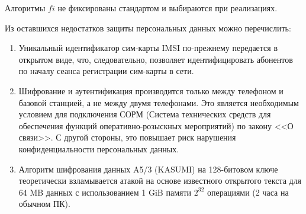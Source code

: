 Алгоритмы $fi$ не фиксированы стандартом и выбираются при реализациях.

Из оставшихся недостатков защиты персональных данных можно перечислить:
\begin{enumerate}
    \item Уникальный идентификатор сим-карты IMSI по-прежнему передается в открытом виде, что, следовательно, позволяет идентифицировать абонентов по началу сеанса регистрации сим-карты в сети.
    \item Шифрование и аутентификация производится только между телефоном и базовой станцией, а не между двумя телефонами. Это является необходимым условием для подключения СОРМ (Система технических средств для обеспечения функций оперативно-розыскных мероприятий) по закону <<О связи>>. С другой стороны, это  повышает риск нарушения конфиденциальности персональных данных.
    \item Алгоритм шифрования данных A5/3 (KASUMI) на 128-битовом ключе теоретически взламывается атакой на основе известного открытого текста для 64 MB данных с использованием 1 GiB памяти $2^{32}$ операциями (2 часа на обычном ПК).
\end{enumerate}
